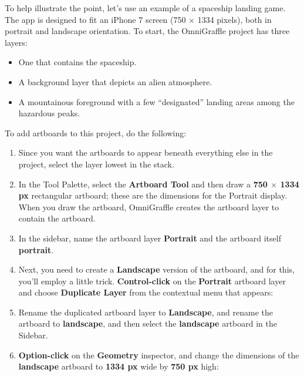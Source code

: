 \documentclass[../main.tex]{subfiles}
\begin{document}
To help illustrate the point, let's use an example of a spaceship landing game. The app is
designed to fit an iPhone 7 screen (750 $\times$ 1334 pixels), both in portrait and landscape
orientation. To start, the OmniGraffle project has three layers:

\begin{itemize}
  \item One that contains the spaceship.
  \item A background layer that depicts an alien atmosphere.
  \item A mountainous foreground with a few ``designated'' landing areas among the hazardous
    peaks.
\end{itemize}

To add artboards to this project, do the following:

\begin{enumerate}
  \item Since you want the artboards to appear beneath everything else in the project, select
    the layer lowest in the stack.
  \item In the Tool Palette, select the \textbf{Artboard Tool} and then draw a \textbf{750
    $\times$ 1334 px} rectangular artboard; these are the dimensions for the Portrait display.
    When you draw the artboard, OmniGraffle creates the artboard layer to contain the artboard.
  \item In the sidebar, name the artboard layer \textbf{Portrait} and the artboard itself
    \textbf{portrait}.

  \item Next, you need to create a \textbf{Landscape} version of the artboard, and for this,
    you'll employ a little trick. \textbf{Control-click} on the \textbf{Portrait} artboard layer
    and choose \textbf{Duplicate Layer} from the contextual menu that appears:

  \item Rename the duplicated artboard layer to \textbf{Landscape}, and rename the artboard to
    \textbf{landscape}, and then select the \textbf{landscape} artboard in the Sidebar.

  \item \textbf{Option-click} on the \textbf{Geometry} inspector, and change the dimensions of
    the \textbf{landscape} artboard to \textbf{1334 px} wide by \textbf{750 px} high:


\end{enumerate}
\end{document}
